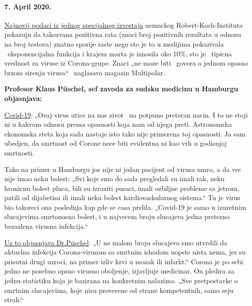\hypertarget{7-april-2020}{%
\paragraph{7. April 2020.}\label{7-april-2020}}

\href{https://multipolar-magazin.de/artikel/coronavirus-regierung-ignoriert-daten}{Najnovij
podaci iz jednog specijalnog izvestaja} nemackog Robert-Koch-Instituta
pokazuju da takozvana pozitivna rata (znaci broj pozitivnih rezultata u
odnosu na broj testova) znatno sporije raste nego sto je to u medijima
pokazivala ~eksponencijalna funkcija i krajem marta je iznosila oko
10\%, sto je ~tipicna vrednost za viruse iz Corona-grupe. Znaci „ne moze
biti ~govora o jednom opasno brzom sirenju virusa`` ~naglasava magazin
Multipolar.

\textbf{Profesor Klaus Püschel, sef zavoda za sudsku medicinu u Hamburgu
objasnjava:}

\href{https://www.pressreader.com/germany/hamburger-morgenpost/20200403/281487868456736}{Covid-19}:
„Ovaj virus utice na nas zivot~ na potpuno preteran nacin. I to ne stoji
ni u kakvom odnosu prema opasnosti koja nam od njega preti. Astronomska
ekonomska steta koja sada nastaje isto tako nije primerena toj
opasnosti. Ja sam ubedjen, da smrtnost od Corone nece biti evidentna ni
kao vrh u godisnjoj smrtnosti.

Tako na primer u Hamburgu jos nije ni jedan pacijent od virusa umro, a
da vec nije imao neku bolest: „Svi koje smo do sada pregledali su imali
rak, neku hronicnu bolest pluca, bili su izraziti pusaci, imali ozbiljne
probleme sa jetrom, patili od dijabetisa ili imali neku bolest
kardiovaskularnog sistema.`` Tu je virus bio takoreci ona poslednja kap
gde se casa prelila. „Covid-19 je samo u izuzetnim slucajevima
smrtonosna bolest, i u najvecem broju slucajeva jedna pretezno bezazlena
virusna infekcija.``

\href{https://www.abendblatt.de/hamburg/article228828787/rechtsmedizin-pueschel-hamburg-corona-virus-infektion-covid-19-coronavirus-krise-patienten-krankenhaeuser-kliniken-infektionsrate-krankheit-pandemie-test-lungenkrankheit-sars-cov-epidemie-sars-cov-2.html}{Uz
to objasnjava Dr.Püschel}: „U ne malom broju slucajeva smo utvrdili da
aktuelna infekcija Corona-virusom sa smrtnim ishodom uopste nista nema,
jer su prisutni drugi uzroci, na primer izliv krvi u mozak ili
infarkt.`` Corona je po sebi jedno ne posebno opsno virusno oboljenje,
izjavljuje medicinar. On pledira za jednu statistiku koja je bazirana na
konkretnim nalazima. „Sve pretpostavke o smrtnim slucajevima, koje nisu
proverene od strane kompetentnih, samo seju strah.``

